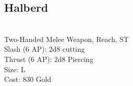 \subsection{Halberd}\label{weapon:halberd}\\
Two-Handed Melee Weapon,  Reach, ST\\
Slash (6 AP): 2d8 cutting\\
Thrust (6 AP): 2d8 Piercing\\
Size: L\\
Cost: 830 Gold\\